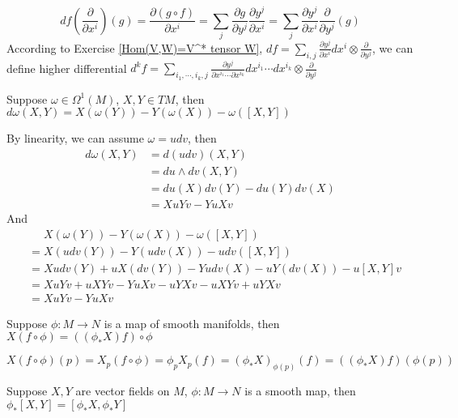 \documentclass[main]{subfiles}
\begin{document}
\begin{solution}
\[df\left(\dfrac{\partial}{\partial x^i}\right)(g)=\dfrac{\partial(g\circ f)}{\partial x^i}=\sum_j\dfrac{\partial g}{\partial y^j}\dfrac{\partial y^j}{\partial x^i}=\sum_j\dfrac{\partial y^j}{\partial x^i}\dfrac{\partial}{\partial y^j}(g)\]
According to Exercise \ref{Hom(V,W)=V^* tensor W}, $df=\sum_{i,j}\frac{\partial y^j}{\partial x^i}dx^i\otimes\frac{\partial}{\partial y^j}$, we can define higher differential $d^kf=\sum_{i_1,\cdots,i_k,j}\frac{\partial y^j}{\partial x^{i_1}\cdots\partial x^{i_k}}dx^{i_1}\cdots dx^{i_k}\otimes\frac{\partial}{\partial y^j}$
\end{solution}

\begin{exercise}\label{Exterior derivative of one form}
Suppose $\omega\in\Omega^1(M)$, $X,Y\in TM$, then $d\omega(X,Y)=X(\omega(Y))-Y(\omega(X))-\omega([X,Y])$
\end{exercise}

\begin{solution}
By linearity, we can assume $\omega=udv$, then
\begin{align*}
d\omega(X,Y)&=d(udv)(X,Y) \\
&=du\wedge dv(X,Y) \\
&=du(X)dv(Y)-du(Y)dv(X) \\
&=XuYv-YuXv
\end{align*}
And
\begin{align*}
&\,\,\quad X(\omega(Y))-Y(\omega(X))-\omega([X,Y]) \\
&=X(udv(Y))-Y(udv(X))-udv([X,Y]) \\
&=Xudv(Y)+uX(dv(Y))-Yudv(X)-uY(dv(X))-u[X,Y]v \\
&=XuYv+uXYv-YuXv-uYXv-uXYv+uYXv \\
&=XuYv-YuXv
\end{align*}
\end{solution}

\begin{exercise}\label{Pushforward of vector field}
Suppose $\phi:M\to N$ is a map of smooth manifolds, then $X(f\circ\phi)=((\phi_*X)f)\circ\phi$
\end{exercise}

\begin{solution}
$X(f\circ\phi)(p)=X_p(f\circ\phi)=\phi_pX_p(f)=(\phi_*X)_{\phi(p)}(f)=((\phi_*X)f)(\phi(p))$
\end{solution}

\begin{exercise}\label{Naturality of Lie bracket}
Suppose $X,Y$ are vector fields on $M$, $\phi:M\to N$ is a smooth map, then $\phi_*[X,Y]=[\phi_*X,\phi_*Y]$
\end{exercise}
\end{document}
